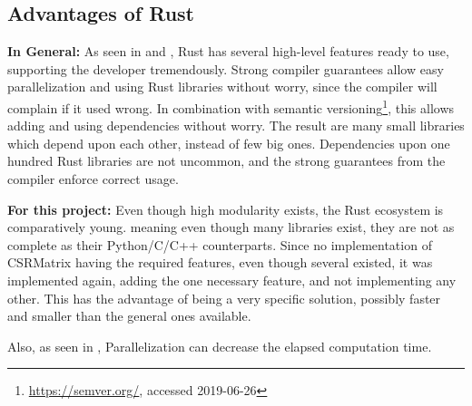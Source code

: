 


\subsection{Advantages of Rust}\label{sec:RustAdvantages}


\textbf{In General:} As seen in  and
, Rust has several high-level features ready to use,
supporting the developer tremendously. Strong compiler guarantees allow easy
parallelization and using Rust libraries without worry, since the compiler will
complain if it used wrong. In combination with semantic
versioning\footnote{\url{https://semver.org/}, accessed 2019-06-26}, this
allows adding and using dependencies without worry. The result are many small
libraries which depend upon each other, instead of few big ones. Dependencies
upon one hundred Rust libraries are not uncommon, and the strong guarantees
from the compiler enforce correct usage.

\textbf{For this project:} Even though high modularity exists, the Rust
ecosystem is comparatively young. meaning even though many libraries exist,
they are not as complete as their Python/C/C++ counterparts. Since no
implementation of CSRMatrix having the required features, even though several
existed, it was implemented again, adding the one necessary feature, and not
implementing any other. This has the advantage of being a very specific
solution, possibly faster and smaller than the general ones available.

Also, as seen in , Parallelization can decrease
the elapsed computation time.




